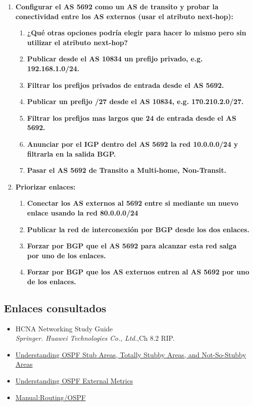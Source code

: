 \documentclass[letterpaper,12pt]{article}
\begin{document}
\begin{enumerate}
		\item \textbf{Configurar el AS 5692 como un AS de transito y probar la conectividad entre los AS externos (usar el atributo next-hop):}
		\begin{enumerate}
			\item \textbf{¿Qué otras opciones podría elegir para hacer lo mismo pero sin utilizar el atributo next-hop?}
			\item \textbf{Publicar desde el AS 10834 un prefijo privado, e.g. 192.168.1.0/24.}
			\item \textbf{Filtrar los prefijos privados de entrada desde el AS 5692.}
			\item \textbf{Publicar un prefijo /27 desde el AS 10834, e.g. 170.210.2.0/27.}
			\item \textbf{Filtrar los prefijos mas largos que 24 de entrada desde el AS 5692.}
			\item \textbf{Anunciar por el IGP dentro del AS 5692 la red 10.0.0.0/24 y filtrarla en la salida BGP.}
			\item \textbf{Pasar el AS 5692 de Transito a Multi-home, Non-Transit.}
		\end{enumerate}
		
		\item \textbf{Priorizar enlaces:}
		\begin{enumerate}
			\item \textbf{Conectar los AS externos al 5692 entre si mediante un nuevo enlace usando la red 80.0.0.0/24}
			\item \textbf{Publicar la red de interconexión por BGP desde los dos enlaces.}
			\item \textbf{Forzar por BGP que el AS 5692 para alcanzar esta red salga por uno de los enlaces.}
			\item \textbf{Forzar por BGP que los AS externos entren al AS 5692 por uno de los enlaces.}
		\end{enumerate}
	\end{enumerate}

	\subsection{Enlaces consultados}
		\begin{itemize}
			\item{HCNA Networking Study Guide}  \\
			\textit{Springer. Huawei Technologies Co., Ltd.},Ch 8.2 RIP.
			\item \href{https://www.juniper.net/documentation/en_US/junos/topics/concept/ospf-stub-áreas-overview.html}
			{Understanding OSPF Stub Areas, Totally Stubby Areas, and Not-So-Stubby Areas}
			\item \href{https://www.juniper.net/documentation/en_US/junos/topics/concept/ospf-routing-external-metrics-overview.html}
			{Understanding OSPF External Metrics}
			\item \href{https://wiki.mikrotik.com/wiki/Manual:Routing/OSPF}
			{Manual:Routing/OSPF}

		\end{itemize}
\end{document}
